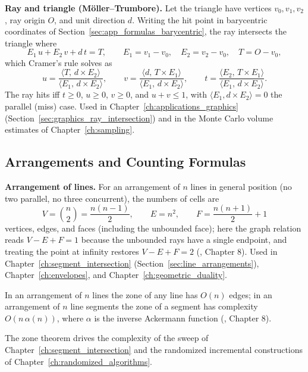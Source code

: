 \medskip\noindent\textbf{Ray and triangle (M\"oller--Trumbore).}
Let the triangle have vertices $v_0, v_1, v_2$, ray origin $O$, and unit
direction $d$. Writing the hit point in barycentric coordinates of
Section~\ref{sec:app_formulas_barycentric}, the ray intersects the triangle
where
\[
  E_1\,u + E_2\,v + d\,t = T,
  \qquad
  E_1 = v_1 - v_0,\quad E_2 = v_2 - v_0,\quad T = O - v_0,
\]
which Cramer's rule solves as
\[
  u = \frac{\langle T,\, d\times E_2\rangle}{\langle E_1,\, d\times E_2\rangle},
  \qquad
  v = \frac{\langle d,\, T\times E_1\rangle}{\langle E_1,\, d\times E_2\rangle},
  \qquad
  t = \frac{\langle E_2,\, T\times E_1\rangle}{\langle E_1,\, d\times E_2\rangle}.
\]
The ray hits iff $t \ge 0$, $u \ge 0$, $v \ge 0$, and $u + v \le 1$, with
$\langle E_1, d\times E_2\rangle = 0$ the parallel (miss) case. Used in
Chapter~\ref{ch:applications_graphics} (Section~\ref{sec:graphics_ray_intersection})
and in the Monte Carlo volume estimates of Chapter~\ref{ch:sampling}.

\subsection{Arrangements and Counting Formulas}
\label{sec:appform_counting}

\medskip\noindent\textbf{Arrangement of lines.}
For an arrangement of $n$ lines in general position (no two parallel, no
three concurrent), the numbers of cells are
\[
  V = \binom{n}{2} = \frac{n(n-1)}{2},
  \qquad
  E = n^2,
  \qquad
  F = \frac{n(n+1)}{2} + 1
\]
vertices, edges, and faces (including the unbounded face); here the graph
relation reads $V - E + F = 1$ because the unbounded rays have a single
endpoint, and treating the point at infinity restores $V - E + F = 2$
(\cite{deberg2008}, Chapter 8). Used in Chapter~\ref{ch:segment_intersection}
(Section~\ref{sec:line_arrangements}), Chapter~\ref{ch:envelopes}, and
Chapter~\ref{ch:geometric_duality}.

\begin{theorem}\label{thm:appform_zone}
  In an arrangement of $n$ lines the zone of any line has $O(n)$ edges;
  in an arrangement of $n$ line segments the zone of a segment has
  complexity $O(n\,\alpha(n))$, where $\alpha$ is the inverse
  Ackermann function (\cite{deberg2008}, Chapter 8).
\end{theorem}
The zone theorem drives the complexity of the sweep of
Chapter~\ref{ch:segment_intersection} and the randomized incremental
constructions of Chapter~\ref{ch:randomized_algorithms}.

